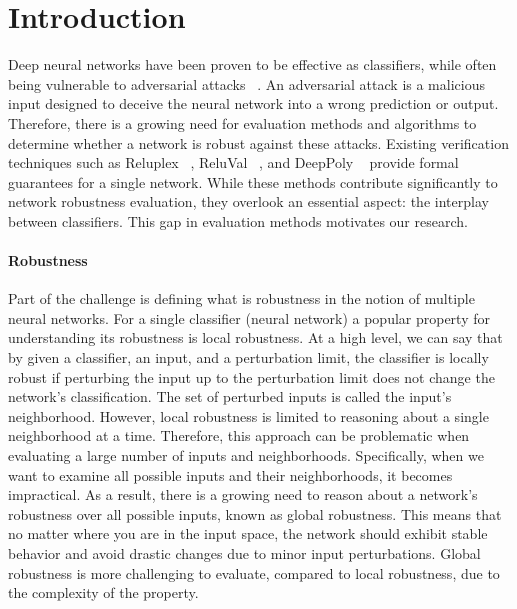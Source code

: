 
\section{Introduction}
Deep neural networks have been proven to be effective as classifiers, while often being vulnerable to adversarial attacks ~\cite{INTPROP}. An adversarial attack is a malicious input designed to deceive the neural network into a wrong prediction or output. Therefore, there is a growing need for evaluation methods and algorithms to determine whether a network is robust against these attacks. Existing verification techniques such as Reluplex ~\cite{Reluplex}, ReluVal ~\cite{FORMALSEC}, and DeepPoly ~\cite{linearOverapprox} provide formal guarantees for a single network. While these methods contribute significantly to network robustness evaluation, they overlook an essential aspect: the interplay between classifiers. This gap in evaluation methods motivates our research.


\paragraph{Robustness}
Part of the challenge is defining what is robustness in the notion of multiple neural networks. For a single classifier (neural network) a popular property for understanding its robustness is local robustness. At a high level, we can say that by given a classifier, an input, and a perturbation limit, the classifier is locally robust if perturbing the input up to the perturbation limit does not change the network’s classification. The set of perturbed inputs is called the input’s neighborhood. However, local robustness is limited to reasoning about a single neighborhood at a time. Therefore, this approach can be problematic when evaluating a large number of inputs and neighborhoods. Specifically, when we want to examine all possible inputs and their neighborhoods, it becomes impractical. As a result, there is a growing need to reason about a network’s robustness over all possible inputs, known as global robustness. This means that no matter where you are in the input space, the network should exhibit stable behavior and avoid drastic changes due to minor input perturbations. Global robustness is more challenging to evaluate, compared to local robustness, due to the complexity of the property. 


